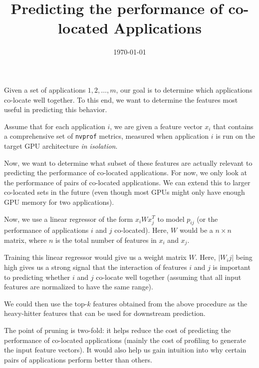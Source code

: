 \documentclass{article}
\title{Predicting the performance of co-located Applications}
\date{\today}
\begin{document}
\maketitle

Given a set of applications $1, 2, \ldots, m$, our goal is to determine which
applications co-locate well together. To this end, we want to determine the features
most useful in predicting this behavior.

Assume that for each application $i$, we are given a feature vector $x_i$ that
contains a comprehensive set of \texttt{nvprof} metrics, measured when application
$i$ is run on the target GPU architecture \emph{in isolation}.

Now, we want to determine what subset of these features are actually relevant
to predicting the performance of co-located applications. For now, we only
look at the performance of pairs of co-located applications. We can extend this
to larger co-located sets in the future (even though most GPUs might only have
enough GPU memory for two applications).

Now, we use a linear regressor of the form $x_i W x_j^T$ to model $p_{ij}$
(or the performance of applications $i$ and $j$ co-located). Here, $W$ would be
a $n \times n$ matrix, where $n$ is the total number of features in $x_i$ and $x_j$.

Training this linear regressor would give us a weight matrix $W$. Here, $|W_ij|$ being
high gives us a strong signal that the interaction of features $i$ and $j$ is important
to predicting whether $i$ and $j$ co-locate well together (assuming that all
input features are normalized to have the same range).

We could then use the top-$k$ features obtained from the above procedure as the
heavy-hitter features that can be used for downstream prediction.

The point of pruning is two-fold: it helps reduce the cost of
predicting the performance of co-located applications (mainly the cost of
profiling to generate the input feature vectors). It would also help us gain
intuition into why certain pairs of applications perform better than others.
\end{document}
